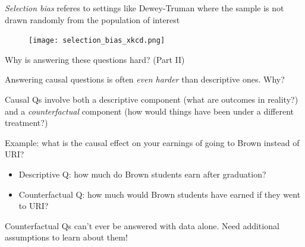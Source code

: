 \documentclass[11pt,english,handout]{beamer}
\newenvironment{wideitemize}{\itemize\addtolength{\itemsep}{10pt}}{\enditemize}
\begin{document}
\begin{frame}
	\textit{Selection bias} referes to settings like Dewey-Truman where the sample is not drawn randomly from the population of interest


	\begin{figure}
		\centering
		\texttt{[image: selection\_bias\_xkcd.png]}
	\end{figure}


\end{frame}


\begin{frame}{Why is answering these questions hard? (Part II)}
\begin{wideitemize}
	\item
	Answering causal questions is often \textit{even harder} than descriptive ones. Why?
	
	\pause
	\item
	Causal Qs involve both a descriptive component (what are outcomes in reality?) and a \textit{counterfactual} component (how would things have been under a different treatment?)
	
	\pause
	\item
	Example: what is the causal effect on your earnings of going to Brown instead of URI? 
		\begin{itemize}
			\item
			Descriptive Q: how much do Brown students earn after graduation? 
			
			\item
			Counterfactual Q: how much would Brown students have earned if they went to URI?  
		\end{itemize}
		
	\pause 	
	\item Counterfactual Qs can't ever be answered with data alone. Need additional assumptions to learn about them!	
\end{wideitemize}	
\end{frame}
\end{document}
